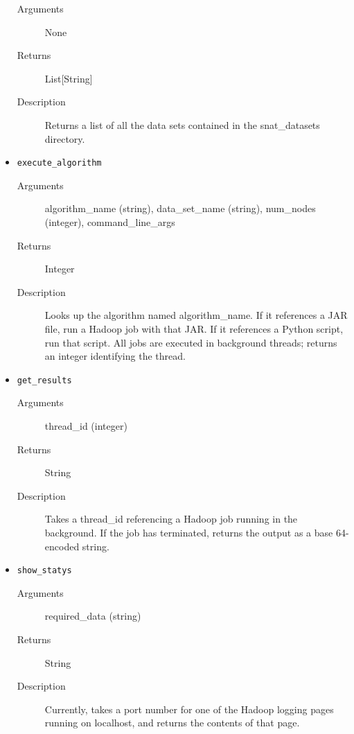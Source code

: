 \begin{itemize}
    \begin{description}        
        \item[Arguments] None
        
        \item[Returns] List[String]
        
        \item[Description] Returns a list of all the data sets contained in the
snat\_datasets directory.
    \end{description}
    
    \item {\tt execute\_algorithm}

    \begin{description}        
        \item[Arguments] algorithm\_name (string), data\_set\_name (string),
num\_nodes (integer), command\_line\_args
        
        \item[Returns] Integer
        
        \item[Description] Looks up the algorithm named algorithm\_name. If it
references a JAR file, run a Hadoop job with that JAR. If it references a Python
script, run that script. All jobs are executed in background threads; returns an
integer identifying the thread.
    \end{description}
    
    \item {\tt get\_results}

    \begin{description}        
        \item[Arguments] thread\_id (integer)
        
        \item[Returns] String
        
        \item[Description] Takes a thread\_id referencing a Hadoop job running
in the background. If the job has terminated, returns the output as a base
64-encoded string.
    \end{description}
    
    \item {\tt show\_statys}

    \begin{description}        
        \item[Arguments] required\_data (string)
        
        \item[Returns] String
        
        \item[Description] Currently, takes a port number for one of the Hadoop
logging pages running on localhost, and returns the contents of that page.
    \end{description}
\end{itemize}


